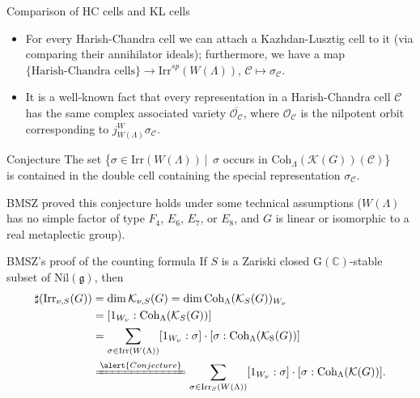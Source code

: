 \documentclass[fleqn,xcolor=dvipsnames]{beamer}
\newcommand{\BC}{{\mathbb {C}}}
\newcommand{\CC}{{\mathcal {C}}}
\newcommand{\CK}{{\mathcal {K}}}
\newcommand{\CO}{{\mathcal {O}}}
\newcommand{\RG}{{\mathrm {G}}}
\newcommand{\RS}{{\mathrm {S}}}
\newcommand{\fg}{\mathfrak{g}}
\newcommand{\Irr}{{\mathrm{Irr}}}
\newcommand{\Nil}{{\mathrm{Nil}}}
\newcommand{\set}[2]{\{#1\,|\,#2\}}
\renewcommand{\bar}{\overline}
\begin{document}
\begin{frame}{Comparison of HC cells and KL cells}
  \begin{itemize}
    \item For every Harish-Chandra cell we can attach a Kazhdan-Lusztig cell to it (via comparing their annihilator ideals); furthermore, we have a map $\{\textrm{Harish-Chandra  cells}\} \to \Irr^{sp}(W(\Lambda))$, $\CC \mapsto \sigma_{\CC}$.
  \item It is a well-known fact that every representation in a Harish-Chandra cell $\CC$ has the \alert{same complex associated variety} $\bar{\CO_{\CC}}$, where $\CO_{\CC}$ is the nilpotent orbit corresponding to $j_{W(\Lambda)}^{W}\sigma_{\CC}$.
  \end{itemize}
  \begin{block}{Conjecture}
    The set \set{$\sigma \in \Irr(W(\Lambda))$}{ \textrm{$\sigma$ occurs in $\mathrm{Coh}_{\Lambda}(\CK(G))(\CC)$}}\\[3pt] is contained in the double cell containing the special representation $\sigma_{\CC}$.
  \end{block}
   BMSZ proved this conjecture holds under some technical assumptions ($W(\Lambda)$ has no simple factor of type $F_4$, $E_6$, $E_7$, or $E_8$, and $G$ is linear or isomorphic to a real metaplectic group).
\end{frame}



\begin{frame}{BMSZ's proof of the counting formula}
  If $S$ is a Zariski closed $\RG(\BC)$-stable subset of $\Nil(\fg)$, then
  \begin{align*}
    \sharp(\Irr_{\nu,S}(G)) &= \dim \CK_{\nu,S}(G) = \dim \mathrm{Coh}_{\Lambda}(\CK_{S}(G))_{W_\nu} \\
    & = [1_{W_{\nu}}:\mathrm{Coh}_{\Lambda}(\CK_{S}(G))] \\
    & = \sum_{\sigma \in \Irr(W(\Lambda))} [1_{W_\nu}:\sigma] \cdot [\sigma:\mathrm{Coh}_{\Lambda}(\CK_{\RS}(G))]\\
    & \xlongequal{\alert{Conjecture}} \sum_{\sigma \in \Irr_{S}(W(\Lambda))} [1_{W_\nu}:\sigma] \cdot [\sigma:\mathrm{Coh}_{\Lambda}(\CK(G))].
  \end{align*}
\end{frame}
\end{document}

